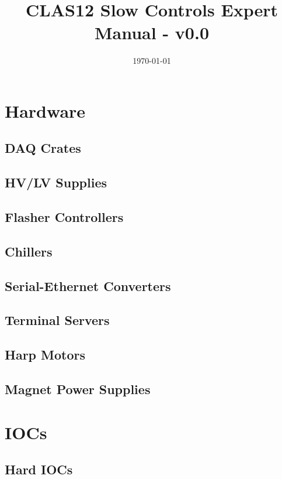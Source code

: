 \documentclass[amsmath,amssymb,notitlepage,11pt]{revtex4}
\begin{document}
\title{CLAS12 Slow Controls Expert Manual - v0.0}
\date{\today}
\begin{abstract}
\end{abstract}

\maketitle
\tableofcontents
\newpage

\section{Hardware}
\subsection{DAQ Crates}
\subsection{HV/LV Supplies}
\subsection{Flasher Controllers}
\subsection{Chillers}
\subsection{Serial-Ethernet Converters}
\subsection{Terminal Servers}
\subsection{Harp Motors}
\subsection{Magnet Power Supplies}

\section{IOCs}
\subsection{Hard IOCs}
\end{document}
